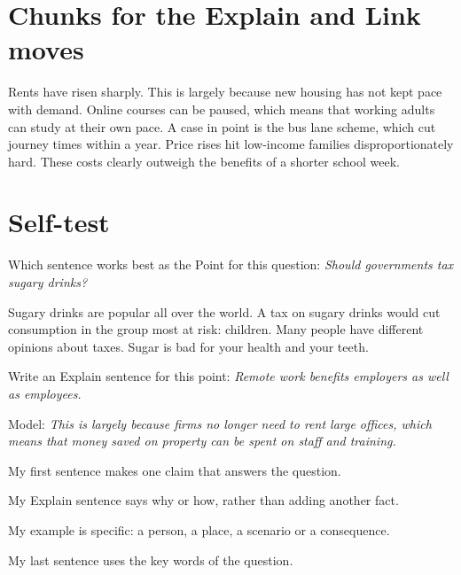 \documentclass[chinese]{tutordesk}
\begin{document}
\section{Chunks for the Explain and Link moves}
\begin{vocab}
    {Rents have risen sharply. This is largely because new housing has not kept pace with demand.}
    {Online courses can be paused, which means that working adults can study at their own pace.}
    {A case in point is the bus lane scheme, which cut journey times within a year.}
    {Price rises hit low-income families disproportionately hard.}
    {These costs clearly outweigh the benefits of a shorter school week.}
\end{vocab}

\section{Self-test}

\begin{question}
Which sentence works best as the Point for this question:
\emph{Should governments tax sugary drinks?}
\begin{choices}
  \choice Sugary drinks are popular all over the world.
  \choice* A tax on sugary drinks would cut consumption in the group most at risk: children.
  \choice Many people have different opinions about taxes.
  \choice Sugar is bad for your health and your teeth.
\end{choices}
\end{question}

\begin{question}
Write an Explain sentence for this point: \emph{Remote work benefits employers as well as employees.}
\begin{solution}
Model: \emph{This is largely because firms no longer need to rent large offices, which means
that money saved on property can be spent on staff and training.}
\end{solution}
\end{question}

\begin{selfcheck}
  \item My first sentence makes one claim that answers the question.
  \item My Explain sentence says why or how, rather than adding another fact.
  \item My example is specific: a person, a place, a scenario or a consequence.
  \item My last sentence uses the key words of the question.
\end{selfcheck}

\printanswers
\end{document}
